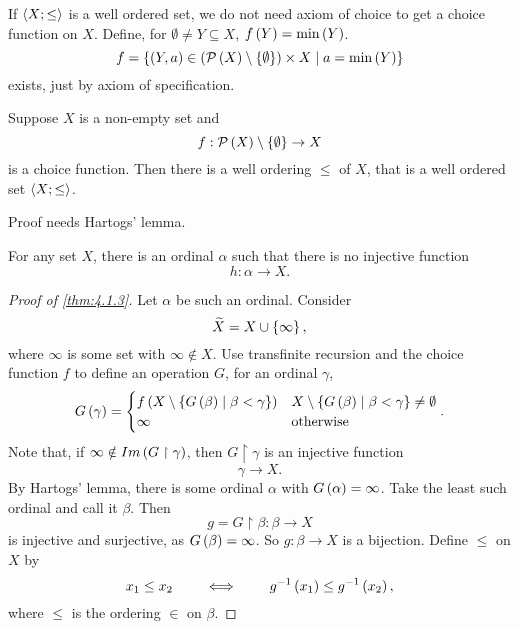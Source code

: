 \begin{note*}
If $ \left\langle X; \le \right\rangle $ is a well ordered set, we do not need axiom of choice to get a choice function on $ X $. Define, for $ \emptyset \ne Y \subseteq X $, $ f\left( Y \right) = \min\left( Y \right) $.
$$ f = \left\{ \left( Y, a \right) \in \left( \mathcal{P}\left( X \right) \setminus \left\{ \emptyset \right\} \right) \times X \mid a = \min\left( Y \right) \right\} $$
exists, just by axiom of specification. 
\end{note*}

\begin{theorem}
\label{thm:4.1.3}
Suppose $ X $ is a non-empty set and
$$ f : \mathcal{P}\left( X \right) \setminus \left\{ \emptyset \right\} \to X $$
is a choice function. Then there is a well ordering $ \le $ of $ X $, that is a well ordered set $ \left\langle X; \le \right\rangle $.
\end{theorem}

Proof needs Hartogs' lemma.

\begin{lemma}
\label{lem:4.1.4}
For any set $ X $, there is an ordinal $ \alpha $ such that there is no injective function
$$ h : \alpha \to X. $$
\end{lemma}

\begin{proof}[Proof of \ref{thm:4.1.3}]
Let $ \alpha $ be such an ordinal. Consider
$$ \widetilde{X} = X \cup \left\{ \infty \right\}, $$
where $ \infty $ is some set with $ \infty \notin X $. Use transfinite recursion and the choice function $ f $ to define an operation $ G $, for an ordinal $ \gamma $,
$$ G\left( \gamma \right) =
\begin{cases}
f\left( X \setminus \left\{ G\left( \beta \right) \mid \beta < \gamma \right\} \right) & X \setminus \left\{ G\left( \beta \right) \mid \beta < \gamma \right\} \ne \emptyset \\
\infty & \text{otherwise}
\end{cases}.
$$
Note that, if $ \infty \notin Im\left( G \upharpoonright \gamma \right) $, then $ G \upharpoonright \gamma $ is an injective function
$$ \gamma \to X. $$
By Hartogs' lemma, there is some ordinal $ \alpha $ with $ G\left( \alpha \right) = \infty $. Take the least such ordinal and call it $ \beta $. Then
$$ g = G \upharpoonright \beta : \beta \to X $$
is injective and surjective, as $ G\left( \beta \right) = \infty $. So $ g : \beta \to X $ is a bijection. Define $ \le $ on $ X $ by
$$ x_1 \le x_2 \qquad \iff \qquad g^{-1}\left( x_1 \right) \le g^{-1}\left( x_2 \right), $$
where $ \le $ is the ordering $ \in $ on $ \beta $.
\end{proof}

\pagebreak

